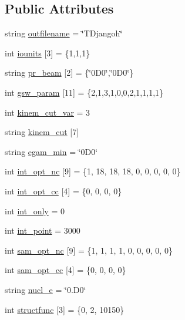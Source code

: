 \subsection*{Public Attributes}
\begin{DoxyCompactItemize}
\item 
string \hyperlink{class_t_djangoh_ad1228120d77c6b6ddaced2c91715415c}{outfilename} = \char`\"{}T\+Djangoh\char`\"{}
\item 
int \hyperlink{class_t_djangoh_a6cc9b21270635d3dcee6de0c7e826726}{iounits} \mbox{[}3\mbox{]} = \{1,1,1\}
\item 
string \hyperlink{class_t_djangoh_ab3ffe8251846f31857f84d4368a31d96}{pr\+\_\+beam} \mbox{[}2\mbox{]} = \{\char`\"{}0\+D0\char`\"{},\char`\"{}0\+D0\char`\"{}\}
\item 
int \hyperlink{class_t_djangoh_a73c1e424fd8153cd323a25390efb2362}{gsw\+\_\+param} \mbox{[}11\mbox{]} = \{2,1,3,1,0,0,2,1,1,1,1\}
\item 
int \hyperlink{class_t_djangoh_a1e292bba8a06321f62a1548e74e0fb9e}{kinem\+\_\+cut\+\_\+var} = 3
\item 
string \hyperlink{class_t_djangoh_a97b4c77f2767a449920e0126ab7314b3}{kinem\+\_\+cut} \mbox{[}7\mbox{]}
\item 
string \hyperlink{class_t_djangoh_a942fe7661f7ca2e6e94eefc7efc8b523}{egam\+\_\+min} = \char`\"{}0\+D0\char`\"{}
\item 
int \hyperlink{class_t_djangoh_acd610fcad702bfa2bc5128426aab1300}{int\+\_\+opt\+\_\+nc} \mbox{[}9\mbox{]} = \{1, 18, 18, 18, 0, 0, 0, 0, 0\}
\item 
int \hyperlink{class_t_djangoh_ac6e61b78890fac424ba060d8411fc266}{int\+\_\+opt\+\_\+cc} \mbox{[}4\mbox{]} = \{0, 0, 0, 0\}
\item 
int \hyperlink{class_t_djangoh_ad3d8b1c563bb610f3a75735e2976f82d}{int\+\_\+only} = 0
\item 
int \hyperlink{class_t_djangoh_a4faef5bd11a1646664432b735c3998e8}{int\+\_\+point} = 3000
\item 
int \hyperlink{class_t_djangoh_adce1a30080fb56c2fb635826eebd05da}{sam\+\_\+opt\+\_\+nc} \mbox{[}9\mbox{]} = \{1, 1, 1, 1, 0, 0, 0, 0, 0\}
\item 
int \hyperlink{class_t_djangoh_a082064f93cd8e978c454044ab86b3007}{sam\+\_\+opt\+\_\+cc} \mbox{[}4\mbox{]} = \{0, 0, 0, 0\}
\item 
string \hyperlink{class_t_djangoh_a80f9f3c2ff9458df6c37f9a730d0d9d7}{nucl\+\_\+e} = \char`\"{}0.\+D0\char`\"{}
\item 
int \hyperlink{class_t_djangoh_ad5881cf0e0f935682730fae53e30798b}{structfunc} \mbox{[}3\mbox{]} = \{0, 2, 10150\}

\end{DoxyCompactItemize}
